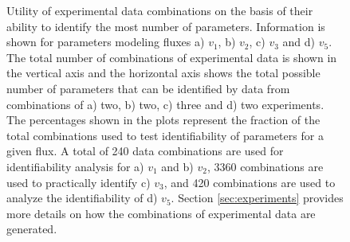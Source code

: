 \documentclass[10pt]{article}
\begin{document}
	\begin{figure}[!tbhp]
		\caption{Utility of experimental data combinations on the basis of their ability to identify the most number of parameters. Information is shown for parameters modeling fluxes a) $v_1$, b) $v_2$, c) $v_3$ and d) $v_5$. The total number of combinations of experimental data is shown in the vertical axis and the horizontal axis shows the total possible number of parameters that can be identified by data from combinations of a) two, b) two, c) three and d) two experiments. The percentages shown in the plots represent the fraction of the total combinations used to test identifiability of parameters for a given flux. A total of 240 data combinations are used for identifiability analysis for a) $v_1$ and b) $v_2$, 3360 combinations are used to practically identify c) $v_3$, and 420 combinations are used to analyze the identifiability of d) $v_5$. Section \ref{sec:experiments} provides more details on how the combinations of experimental data are generated.}\label{fig:data_utility}
	\end{figure}	
\end{document}
